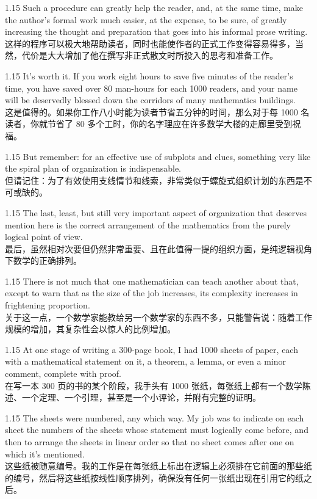 \documentclass[12pt,a4paper]{article}
\newcommand{\bilingual}[2]{
    \begin{spacing}{1.15} %
        \noindent \normalsize #1 \\[-0.5ex] %
        \small \textcolor{blue!70!black}{#2} %
    \end{spacing}
    \vspace{0.8em} %
}
\begin{document}
\bilingual{Such a procedure can greatly help the reader, and, at the same time, make the author's formal work much easier, at the expense, to be sure, of greatly increasing the thought and preparation that goes into his informal prose writing.}
{这样的程序可以极大地帮助读者，同时也能使作者的正式工作变得容易得多，当然，代价是大大增加了他在撰写非正式散文时所投入的思考和准备工作。} %

\bilingual{It's worth it. If you work eight hours to save five minutes of the reader's time, you have saved over 80 man-hours for each 1000 readers, and your name will be deservedly blessed down the corridors of many mathematics buildings.}
{这是值得的。如果你工作八小时能为读者节省五分钟的时间，那么对于每 1000 名读者，你就节省了 80 多个工时，你的名字理应在许多数学大楼的走廊里受到祝福。} %

\bilingual{But remember: for an effective use of subplots and clues, something very like the spiral plan of organization is indispensable.}
{但请记住：为了有效使用支线情节和线索，非常类似于螺旋式组织计划的东西是不可或缺的。} %

\bilingual{The last, least, but still very important aspect of organization that deserves mention here is the correct arrangement of the mathematics from the purely logical point of view.}
{最后，虽然相对次要但仍然非常重要、且在此值得一提的组织方面，是纯逻辑视角下数学的正确排列。} %

\bilingual{There is not much that one mathematician can teach another about that, except to warn that as the size of the job increases, its complexity increases in frightening proportion.}
{关于这一点，一个数学家能教给另一个数学家的东西不多，只能警告说：随着工作规模的增加，其复杂性会以惊人的比例增加。} %

\bilingual{At one stage of writing a 300-page book, I had 1000 sheets of paper, each with a mathematical statement on it, a theorem, a lemma, or even a minor comment, complete with proof.}
{在写一本 300 页的书的某个阶段，我手头有 1000 张纸，每张纸上都有一个数学陈述、一个定理、一个引理，甚至是一个小评论，并附有完整的证明。} %

\bilingual{The sheets were numbered, any which way. My job was to indicate on each sheet the numbers of the sheets whose statement must logically come before, and then to arrange the sheets in linear order so that no sheet comes after one on which it's mentioned.}
{这些纸被随意编号。我的工作是在每张纸上标出在逻辑上必须排在它前面的那些纸的编号，然后将这些纸按线性顺序排列，确保没有任何一张纸出现在引用它的纸之后。} %
\end{document}
